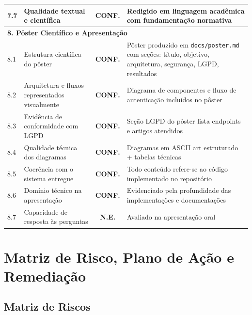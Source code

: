 \documentclass[11pt, a4paper]{article}
\newcommand{\conf}{\textcolor{conf}{\textbf{CONF.}}}
\newcommand{\neve}{\textcolor{ne}{\textbf{N.E.}}}
\begin{document}
\begin{longtable}{p{0.8cm}p{5.5cm}cp{8.2cm}}
7.7 & Qualidade textual e científica & \conf & Redigido em linguagem acadêmica com fundamentação normativa \\
\midrule
\multicolumn{4}{l}{\textbf{8. Pôster Científico e Apresentação}} \\
\midrule
8.1 & Estrutura científica do pôster & \conf & Pôster produzido em \texttt{docs/poster.md} com seções: título, objetivo, arquitetura, segurança, LGPD, resultados \\
8.2 & Arquitetura e fluxos representados visualmente & \conf & Diagrama de componentes e fluxo de autenticação incluídos no pôster \\
8.3 & Evidência de conformidade com LGPD & \conf & Seção LGPD do pôster lista endpoints e artigos atendidos \\
8.4 & Qualidade técnica dos diagramas & \conf & Diagramas em ASCII art estruturado + tabelas técnicas \\
8.5 & Coerência com o sistema entregue & \conf & Todo conteúdo refere-se ao código implementado no repositório \\
8.6 & Domínio técnico na apresentação & \conf & Evidenciado pela profundidade das implementações e documentações \\
8.7 & Capacidade de resposta às perguntas & \neve & Avaliado na apresentação oral \\

\end{longtable}

\section{Matriz de Risco, Plano de Ação e Remediação}

\subsection{Matriz de Riscos}
\end{document}
